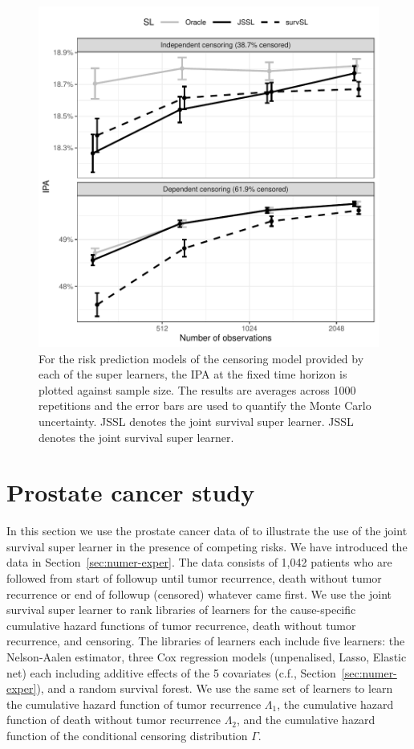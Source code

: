 \documentclass[a4paper,danish]{article}
\theoremstyle{plain} %
\numberwithin{theorem}{section}
\theoremstyle{definition} %
\theoremstyle{remark}
\newcommand{\1}{\mathds{1}}
\begin{document}
\begin{figure}
  \centering %
  \includegraphics[width=.7\linewidth]{experiment-fig-sl-survSL-cens.pdf}
  \caption[]{For the risk prediction models of the censoring model
    provided by each of the super learners, the IPA at the fixed time
    horizon is plotted against sample size. The results are averages
    across 1000 repetitions and the error bars are used to quantify
    the Monte Carlo uncertainty. JSSL denotes the joint survival super
    learner. JSSL denotes the joint survival super learner.}
  \label{fig:zelefski-cens}
\end{figure}


\section{Prostate cancer study}
\label{sec:real-data-appl}

In this section we use the prostate cancer data of
\cite{kattan2000pretreatment} to illustrate the use of the joint survival super learner in the presence of competing risks. We have
introduced the data in Section~\ref{sec:numer-exper}. The data
consists of 1,042 patients who are followed from start of
followup until tumor recurrence, death without tumor
recurrence or end of followup (censored) whatever came first.
We use the joint survival super learner to rank libraries of learners for the
cause-specific cumulative hazard functions of tumor
recurrence, death without tumor recurrence, and censoring. The
libraries of learners each include five learners: the
Nelson-Aalen estimator, three Cox regression models
(unpenalised, Lasso, Elastic net) each including additive
effects of the 5 covariates (c.f., Section~\ref{sec:numer-exper}),
and a random survival forest. We use the same set of learners
to learn the cumulative hazard function of tumor recurrence
\( \Lambda_1 \), the cumulative hazard function of death
without tumor recurrence \( \Lambda_2 \), and the cumulative
hazard function of the conditional censoring distribution
$\Gamma$.
\end{document}
